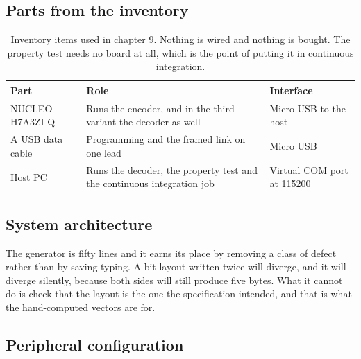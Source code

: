 \subsection*{Parts from the inventory}

\begin{table}[H]\centering\small
\begin{tabular}{p{40mm}p{66mm}p{40mm}}
\toprule
Part & Role & Interface \\
\midrule
NUCLEO-H7A3ZI-Q & Runs the encoder, and in the third variant the decoder as well & Micro USB to the host \\
A USB data cable & Programming and the framed link on one lead & Micro USB \\
Host PC & Runs the decoder, the property test and the continuous integration job & Virtual COM port at 115200 \\
\bottomrule
\end{tabular}
\caption{Inventory items used in chapter 9. Nothing is wired and nothing is bought. The property test needs no board at all, which is the point of putting it in continuous integration.}
\end{table}

\subsection*{System architecture}


The generator is fifty lines and it earns its place by removing a class of
defect rather than by saving typing. A bit layout written twice will diverge,
and it will diverge silently, because both sides will still produce five bytes.
What it cannot do is check that the layout is the one the specification
intended, and that is what the hand-computed vectors are for.

\subsection*{Peripheral configuration}


